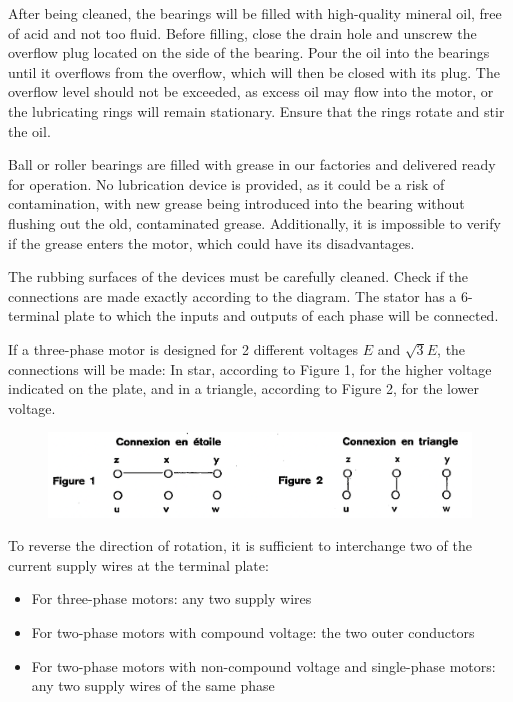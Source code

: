 After being cleaned, the bearings will be filled with high-quality mineral oil, free of acid and not too fluid.
Before filling, close the drain hole and unscrew the overflow plug located on the side of the bearing.
Pour the oil into the bearings until it overflows from the overflow, which will then be closed with its plug.
The overflow level should not be exceeded, as excess oil may flow into the motor, or the lubricating rings will remain stationary.
Ensure that the rings rotate and stir the oil.

Ball or roller bearings are filled with grease in our factories and delivered ready for operation.
No lubrication device is provided, as it could be a risk of contamination, with new grease being introduced
into the bearing without flushing out the old, contaminated grease.
Additionally, it is impossible to verify if the grease enters the motor, which could have its disadvantages.

The rubbing surfaces of the devices must be carefully cleaned.
Check if the connections are made exactly according to the diagram.
The stator has a 6-terminal plate to which the inputs and outputs of each phase will be connected.

If a three-phase motor is designed for 2 different voltages \(E\) and \(\sqrt{3}E\), the connections will be made:
In star, according to Figure 1, for the higher voltage indicated on the plate, and in a triangle, according to Figure 2,
for the lower voltage.

\begin{figure}[ht]
    \centering
    \includegraphics[width=1\linewidth]{images/page_64_motor_connections}
    \label{fig:schindler_motor_connections}
\end{figure}

To reverse the direction of rotation, it is sufficient to interchange two of the current supply wires at the terminal plate:

\begin{itemize}
    \item For three-phase motors: any two supply wires
    \item For two-phase motors with compound voltage: the two outer conductors
    \item For two-phase motors with non-compound voltage and single-phase motors: any two supply wires of the same phase
\end{itemize}

